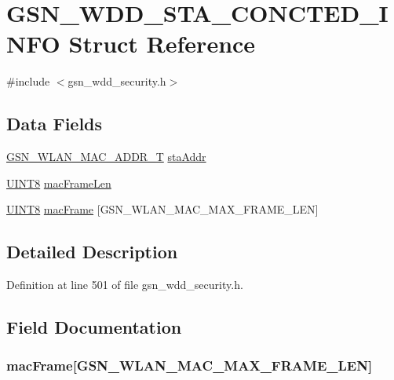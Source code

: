 \hypertarget{a00298}{
\section{GSN\_\-WDD\_\-STA\_\-CONCTED\_\-INFO Struct Reference}
\label{a00298}
}


{\ttfamily \#include $<$gsn\_\-wdd\_\-security.h$>$}

\subsection*{Data Fields}
\begin{DoxyCompactItemize}
\item 
\hyperlink{a00416}{GSN\_\-WLAN\_\-MAC\_\-ADDR\_\-T} \hyperlink{a00298_a3ca54ba7eb6c301c5b6584284a9ccb8b}{staAddr}
\item 
\hyperlink{a00660_gab27e9918b538ce9d8ca692479b375b6a}{UINT8} \hyperlink{a00298_a0501545f895b958ac06fac25a344c502}{macFrameLen}
\item 
\hyperlink{a00660_gab27e9918b538ce9d8ca692479b375b6a}{UINT8} \hyperlink{a00298_a7ad37558062b4ab07712e6577fbd8b88}{macFrame} \mbox{[}GSN\_\-WLAN\_\-MAC\_\-MAX\_\-FRAME\_\-LEN\mbox{]}
\end{DoxyCompactItemize}


\subsection{Detailed Description}


Definition at line 501 of file gsn\_\-wdd\_\-security.h.



\subsection{Field Documentation}
\hypertarget{a00298_a7ad37558062b4ab07712e6577fbd8b88}{
\subsubsection[{macFrame}]{ {\bf macFrame}\mbox{[}GSN\_\-WLAN\_\-MAC\_\-MAX\_\-FRAME\_\-LEN\mbox{]}}}
\label{a00298_a7ad37558062b4ab07712e6577fbd8b88}


